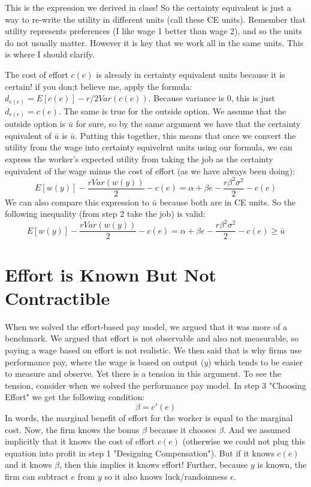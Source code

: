 \documentclass{article}
\begin{document}
This is the expression we derived in class! So the certainty equivalent is just a way to re-write the utility in different units (call these CE units). Remember that utility represents preferences (I like wage 1 better than wage 2), and so the units do not usually matter. However it is key that we work all in the same units. This is where I should clarify.

The cost of effort $c(e)$ is already in certainty equivalent units because it is certain! if you don;t believe me, apply the formula: $d_{c(e)} = E[c(e)]-r/2 Var(c(e))$. Because variance is 0, this is just $d_{c(e)}=c(e)$. The same is true for the outside option. We assume that the outside option is $\bar u$ for sure, so by the same argument we have that the certainty equivalent of $\bar u$ is $\bar u$. Putting this together, this means that once we convert the utility from the wage into certainty equivelrnt units using our formula, we can express the worker's expected utility from taking the job as the certainty equivalent of the wage minus the cost of effort (as we have always been doing):
\[ E[w(y)]-\frac{r Var(w(y))}{2} -c(e)=\alpha +\beta e - \frac{r\beta^2 \sigma^2}{2}-c(e)\]
We can also compare this expression to $\bar u$ because both are in CE units. So the following inequality (from step 2 take the job) is valid:
\[E[w(y)]-\frac{r Var(w(y))}{2} -c(e) =\alpha +\beta e - \frac{r\beta^2 \sigma^2}{2}-c(e)\geq  \bar u\]


\section{Effort is Known But Not Contractible}

When we solved the effort-based pay model, we argued that it was more of a benchmark. We argued that effort is not observable and also not measurable, so paying a wage based on effort is not realistic. We then said that is why firms use performance pay, where the wage is based on output ($y$) which tends to be easier to measure and observe. Yet there is a tension in this argument. To see the tension, consider when we solved the performance pay model. In step 3 "Choosing Effort" we get the following condition:
\[\beta = c'(e)\]
In words, the marginal benefit of effort for the worker is equal to the marginal cost. Now, the firm knows the bonus $\beta$ because it chooses $\beta$. And we assumed implicitly that it knows the cost of effort $c(e)$ (otherwise we could not plug this equation into profit in step 1 "Designing Compensation"). But if it knows $c(e)$ and it knows $\beta$, then this implies it knows effort! Further, because $y$ is known, the firm can subtract $e$ from $y$ so it also knows luck/randomness $\epsilon$.
\end{document}
